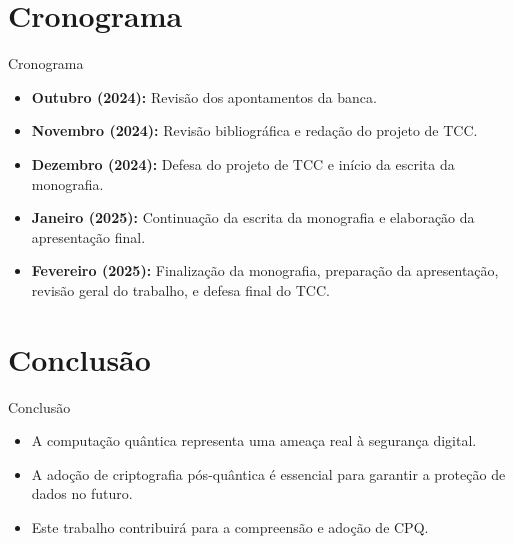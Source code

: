 \documentclass[aspectratio=169]{beamer}
\begin{document}
        \section{Cronograma}
        \begin{frame}{Cronograma}
            \begin{itemize}
                \item \textbf{Outubro (2024):} Revisão dos apontamentos da banca.
                \item \textbf{Novembro (2024):} Revisão bibliográfica e redação do projeto de TCC.
                \item \textbf{Dezembro (2024):} Defesa do projeto de TCC e início da escrita da monografia.
                \item \textbf{Janeiro (2025):} Continuação da escrita da monografia e elaboração da apresentação final.
                \item \textbf{Fevereiro (2025):} Finalização da monografia, preparação da apresentação, revisão geral do trabalho, e defesa final do TCC.
            \end{itemize}
        \end{frame}
        
	\section{Conclusão}
	\begin{frame}{Conclusão}
		\begin{itemize}
			\item A computação quântica representa uma ameaça real à segurança digital.
			\item A adoção de criptografia pós-quântica é essencial para garantir a proteção de dados no futuro.
			\item Este trabalho contribuirá para a compreensão e adoção de CPQ.
		\end{itemize}
	\end{frame}




	
\end{document}

